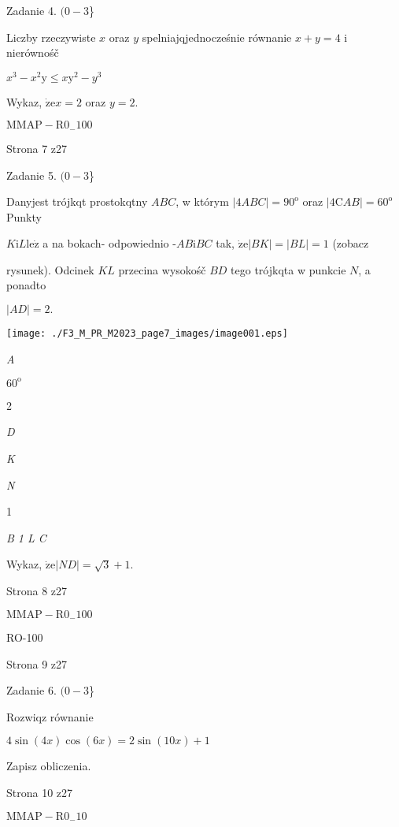 \documentclass[a4paper,12pt]{article}
\begin{document}
Zadanie 4. $(0-3$\}

Liczby rzeczywiste $x$ oraz $y$ spelniajqjednocześnie równanie $x+y=4$ i nierównośč

$x^{3}-x^{2}\mathrm{y}\leq x\mathrm{y}^{2}-y^{3}$

Wykaz, $\dot{\mathrm{z}}\mathrm{e} x=2$ oraz $y=2.$

$\mathrm{M}\mathrm{M}\mathrm{A}\mathrm{P}-\mathrm{R}0_{-}100$

Strona 7 z27





Zadanie 5. $(0-3$\}

Danyjest trójkqt prostokqtny $ABC$, w którym $|4ABC|=90^{\mathrm{o}}$ oraz $|4\mathrm{C}AB|=60^{\mathrm{o}}$ Punkty

$K \mathrm{i} L \mathrm{l}\mathrm{e}\dot{\mathrm{z}}$ a na bokach- odpowiednio -$AB \mathrm{i} BC$ tak, $\dot{\mathrm{z}}\mathrm{e} |BK|=|BL|=1$ (zobacz

rysunek). Odcinek $KL$ przecina wysokośč $BD$ tego trójkqta w punkcie $N$, a ponadto

$|AD|=2.$
\begin{center}
\texttt{[image: ./F3\_M\_PR\_M2023\_page7\_images/image001.eps]}
\end{center}
{\it A}

$60^{\mathrm{o}}$

2

{\it D}

{\it K}

{\it N}

1

{\it B 1 L  C}

Wykaz, $\dot{\mathrm{z}}\mathrm{e} |ND|=\sqrt{3}+1.$

Strona 8 z27

$\mathrm{M}\mathrm{M}\mathrm{A}\mathrm{P}-\mathrm{R}0_{-}100$





RO-100

Strona 9 z27





Zadanie 6. $(0-3$\}

Rozwiqz równanie

$4\sin(4x)\cos(6x)=2\sin(10x)+1$

Zapisz obliczenia.

Strona 10 z27

$\mathrm{M}\mathrm{M}\mathrm{A}\mathrm{P}-\mathrm{R}0_{-}10$
\end{document}
